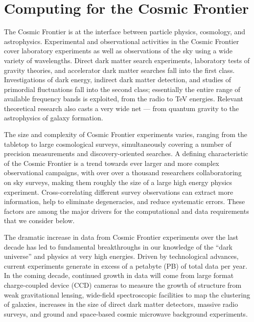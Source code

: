  
\section{Computing for the Cosmic Frontier}


The Cosmic Frontier is at the interface
between particle physics, cosmology, and astrophysics. 
Experimental and observational activities in the Cosmic Frontier cover
laboratory experiments as well as 
observations of the sky using a wide variety of wavelengths.
Direct dark matter search experiments,
laboratory tests of gravity theories, and accelerator dark matter
searches fall into the first class. Investigations of dark energy,
indirect dark matter detection, and studies of primordial fluctuations
fall into the second class; essentially the entire range of available
frequency bands is exploited, from the radio to TeV energies. Relevant
theoretical research also casts a very wide net --- from quantum
gravity to the astrophysics of galaxy formation.

The size and complexity of Cosmic Frontier experiments varies,
ranging from the tabletop to large cosmological surveys,
simultaneously covering a number of precision measurements and
discovery-oriented searches. %
A defining characteristic of the Cosmic Frontier 
is a trend towards ever larger and more complex observational
campaigns, with over over a thousand researchers
collaboratoring on sky surveys, making them roughly the size of
a large high
energy physics experiment. Cross-correlating different survey
observations can extract more information, help to eliminate
degeneracies, and reduce systematic errors. These factors are among
the major drivers for the computational and data requirements that we
consider below.


The dramatic increase in data from Cosmic Frontier experiments over
the last decade has led to fundamental breakthroughs in our knowledge
of the ``dark universe'' and physics at very high energies. Driven by
technological advances, current experiments generate in excess of a
petabyte (PB) of total data per year. 
In the coming decade, continued growth in data will come from
large format 
charge-coupled device (CCD) cameras to measure
the growth of structure from weak gravitational lensing, wide-field
spectroscopic facilities to map the clustering of galaxies, increases
in the size of direct dark matter detectors, massive radio surveys,
and ground and space-based cosmic microwave background 
experiments.

